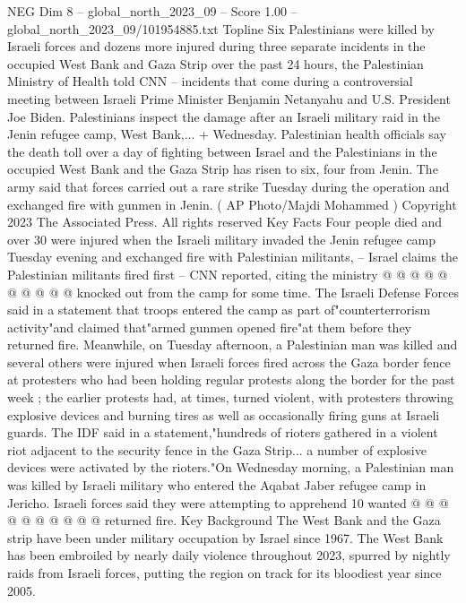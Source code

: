 \begin{textsample}{NEG Dim 8 – global\_north\_2023\_09 – Score 1.00 – global\_north\_2023\_09/101954885.txt}  \label{ex:f8_neg_321}
Topline Six Palestinians were killed by Israeli forces and dozens more injured during three separate incidents in the occupied West Bank and Gaza Strip over the past 24 hours, the Palestinian Ministry of Health told CNN -- incidents that come during a controversial meeting between Israeli Prime Minister Benjamin Netanyahu and U.S.
President Joe Biden.
Palestinians inspect the damage after an Israeli military raid in the Jenin refugee camp, West Bank,... + Wednesday.
Palestinian health officials say the death toll over a day of fighting between Israel and the Palestinians in the occupied West Bank and the Gaza Strip has risen to six, four from Jenin.
The army said that forces carried out a rare strike Tuesday during the operation and exchanged fire with gunmen in Jenin. ( AP Photo/Majdi Mohammed ) Copyright 2023 The Associated Press.
All rights reserved Key Facts Four people died and over 30 were injured when the Israeli military invaded the Jenin refugee camp Tuesday evening and exchanged fire with Palestinian militants, -- Israel claims the Palestinian militants fired first -- CNN reported, citing the ministry @ @ @ @ @ @ @ @ @ @ knocked out from the camp for some time.
The Israeli Defense Forces said in a statement that troops entered the camp as part of"counterterrorism activity"and claimed that"armed gunmen opened fire"at them before they returned fire.
Meanwhile, on Tuesday afternoon, a Palestinian man was killed and several others were injured when Israeli forces fired across the Gaza border fence at protesters who had been holding regular protests along the border for the past week ; the earlier protests had, at times, turned violent, with protesters throwing explosive devices and burning tires as well as occasionally firing guns at Israeli guards.
The IDF said in a statement,"hundreds of rioters gathered in a violent riot adjacent to the security fence in the Gaza Strip... a number of explosive devices were activated by the rioters."On Wednesday morning, a Palestinian man was killed by Israeli military who entered the Aqabat Jaber refugee camp in Jericho.
Israeli forces said they were attempting to apprehend 10 wanted @ @ @ @ @ @ @ @ @ @ returned fire.
Key Background The West Bank and the Gaza strip have been under military occupation by Israel since 1967.
The West Bank has been embroiled by nearly daily violence throughout 2023, spurred by nightly raids from Israeli forces, putting the region on track for its bloodiest year since 2005.

\end{textsample}
